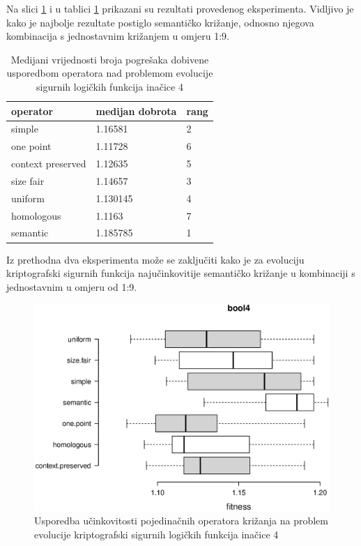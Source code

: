 Na slici \ref{bool4box} i u tablici \ref{bool4table} prikazani su rezultati provedenog eksperimenta. Vidljivo je kako je najbolje rezultate postiglo semantičko križanje, odnosno njegova kombinacija s jednostavnim križanjem u omjeru 1:9.

\begin{table}[H]
 	\centering
 \caption{Medijani vrijednosti broja pogrešaka dobivene usporedbom operatora nad problemom evolucije sigurnih logičkih funkcija inačice 4}
    \begin{tabular}{| l | l | l |}
    \hline
    \textbf{operator} & \textbf{medijan dobrota} & \textbf{rang}\\ \hline
    simple & 1.16581 & 2\\ \hline
    one point & 1.11728 & 6\\ \hline
    context preserved & 1.12635 & 5\\ \hline
    size fair & 1.14657 & 3\\ \hline
    uniform & 1.130145 & 4\\ \hline
    homologous & 1.1163 & 7\\ \hline
    semantic & 1.185785 & 1\\ \hline
    \end{tabular}
    
   
    \label{bool4table}
\end{table}


Iz prethodna dva eksperimenta može se zaključiti kako je za evoluciju kriptografski sigurnih funkcija najučinkovitije semantičko križanje u kombinaciji s jednostavnim u omjeru od 1:9.

\begin{figure}[H]
	\centering
	\includegraphics[trim=0cm 4cm 0cm 0cm, scale=0.6]{./slike/boxPlots/bool4.eps}
	\caption{Usporedba učinkovitosti pojedinačnih operatora križanja na problem evolucije kriptografski sigurnih logičkih funkcija inačice 4}
	\label{bool4box}
\end{figure}


